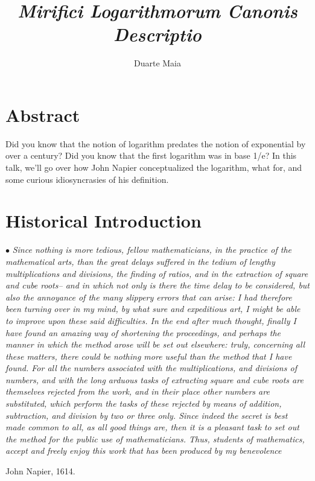 \documentclass{article}
\title{\textit{Mirifici Logarithmorum Canonis Descriptio}}
\author{Duarte Maia}
\newcommand\point[1]{\noindent \hspace{\labelsep} $\bullet$ #1 \smallskip}
\begin{document}
\maketitle

\section{Abstract}

Did you know that the notion of logarithm predates the notion of exponential by over a century? Did you know that the first logarithm was in base 1/e? In this talk, we'll go over how John Napier conceptualized the logarithm, what for, and some curious idiosyncrasies of his definition.

\section{Historical Introduction}

\point{\textit{Since nothing is more tedious, fellow mathematicians, in the practice of the mathematical arts, than the great delays suffered in the tedium of lengthy multiplications and divisions, the finding of ratios, and in the extraction of square and cube roots– and in which not only is there the time delay to be considered, but also the annoyance of the many slippery errors that can arise: I had therefore been turning over in my mind, by what sure and expeditious art, I might be able to improve upon these said difficulties. In the end after much thought, finally I have found an amazing way of shortening the proceedings, and perhaps the manner in which the method arose will be set out elsewhere: truly, concerning all these matters, there could be nothing more useful than the method that I have found. For all the numbers associated with the multiplications, and divisions of numbers, and with the long arduous tasks of extracting square and cube roots are themselves rejected from the work, and in their place other numbers are substituted, which perform the tasks of these rejected by means of addition, subtraction, and division by two or three only. Since indeed the secret is best made common to all, as all good things are, then it is a pleasant task to set out the method for the public use of mathematicians. Thus, students of mathematics, accept and freely enjoy this work that has been produced by my benevolence}

\hfill John Napier, 1614.}

\end{document}
